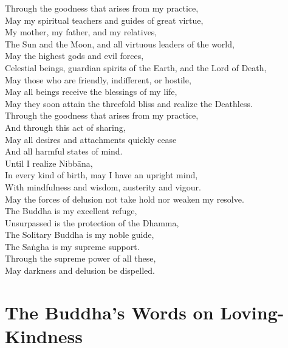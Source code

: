 Through the goodness that arises from my practice,\\
May my spiritual teachers and guides of great virtue,\\
My mother, my father, and my relatives,\\
The Sun and the Moon, and all virtuous leaders of the world,\\
May the highest gods and evil forces,\\
Celestial beings, guardian spirits of the Earth, and the Lord of Death,\\
May those who are friendly, indifferent, or hostile,\\
May all beings receive the blessings of my life,\\
May they soon attain the threefold bliss and realize the Deathless.\\
Through the goodness that arises from my practice,\\
And through this act of sharing,\\
May all desires and attachments quickly cease\\
And all harmful states of mind.\\
Until I realize Nibbāna,\\
In every kind of birth, may I have an upright mind,\\
With mindfulness and wisdom, austerity and vigour.\\
May the forces of delusion not take hold nor weaken my resolve.\\
The Buddha is my excellent refuge,\\
Unsurpassed is the protection of the Dhamma,\\
The Solitary Buddha is my noble guide,\\
The Saṅgha is my supreme support.\\
Through the supreme power of all these,\\
May darkness and delusion be dispelled.

\section{The Buddha's Words on Loving-Kindness}

\begin{leader}
\end{leader}


